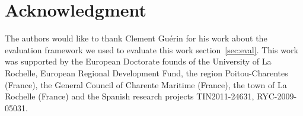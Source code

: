 \documentclass[conference]{IEEEtran}
\begin{document}


\section*{Acknowledgment}
The authors would like to thank Clement Gu\'{e}rin for his work about the evaluation framework we used to evaluate this work section~\ref{sec:eval}. This work was supported by the European Doctorate founds of the  University of La Rochelle, European Regional Development Fund, the region Poitou-Charentes (France), the General Council of Charente Maritime (France), the town of La Rochelle (France) and the Spanish research projects TIN2011-24631, RYC-2009-05031.






%
%
%
%
%

\end{document}
